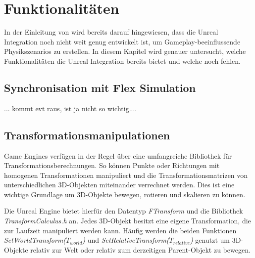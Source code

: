 

\section{Funktionalitäten}
In der Einleitung von \cite{UE4FlexDoc} wird bereits darauf hingewiesen, dass die Unreal Integration noch nicht weit genug entwickelt ist, um Gameplay-beeinflussende Physikszenarios zu erstellen. In diesem Kapitel wird genauer untersucht, welche   Funktionalitäten  die Unreal Integration bereits bietet und welche noch fehlen. 

\subsection{Synchronisation mit Flex Simulation}

... kommt evt raus, ist ja nicht so wichtig....

\subsection{Transformationsmanipulationen}


Game Engines verfügen in der Regel über eine umfangreiche Bibliothek für Transformationsberechnungen. So können Punkte oder Richtungen mit homogenen Transformationen manipuliert und die Transformationsmatrizen von unterschiedlichen 3D-Objekten miteinander verrechnet werden.
Dies ist eine wichtige Grundlage um 3D-Objekte bewegen, rotieren und skalieren zu können. 

Die Unreal Engine bietet hierfür den Datentyp \textit{FTransform} und die Bibliothek \textit{TransformCalculus.h} an. Jedes 3D-Objekt besitzt eine eigene Transformation, die zur Laufzeit manipuliert werden kann. Häufig werden die beiden Funktionen \textit{SetWorldTransform($T_{world}$)} und \textit{SetRelativeTransform($T_{relative}$)} genutzt um 3D-Objekte relativ zur Welt oder relativ zum derzeitigen Parent-Objekt zu bewegen.

